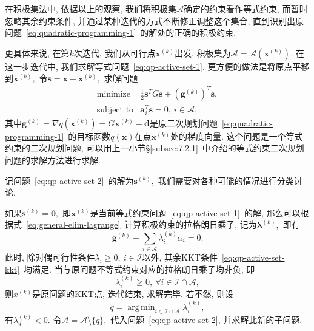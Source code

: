 \documentclass{SBCbookchapter}
\newcommand{\V}[1]{{\bm{#1}}}
\DeclareMathOperator*{\argmin}{arg\,min}
\numberwithin{equation}{section}
\begin{document}
在积极集法中, 依据以上的观察, 我们将积极集$\mathcal{A}$确定的约束看作等式约束, 而暂时忽略其余约束条件, 并通过某种迭代的方式不断修正调整这个集合, 直到识别出原问题~\eqref{eq:quadratic-programming-1}~的解处的正确的积极约束.

更具体来说, 在第$k$次迭代, 我们从可行点$\V{x}^{(k)}$出发, 积极集为$\mathcal{A} = \mathcal{A}(\V{x}^{(k)}).$ 在这一步迭代中, 我们求解等式问题~\eqref{eq:qp-active-set-1}. 更方便的做法是将原点平移到$\V{x}^{(k)},$ 令$\V{s} = \V{x} - \V{x}^{(k)},$ 求解问题
\begin{equation}
\label{eq:qp-active-set-2}
\begin{array}{cl}
\text{minimize} & \frac{1}{2} \V{s}^T G \V{s} + \left( \V{g}^{(k)} \right)^T \V{s}, \\
\text{subject to} & \V{a}_i^T \V{s} = 0, ~ i \in \mathcal{A},
\end{array}
\end{equation}
其中$\V{g}^{(k)} = \nabla q(\V{x}^{(k)}) = G \V{x}^{(k)} + \V{d}$是原二次规划问题~\eqref{eq:quadratic-programming-1}~的目标函数$q(\V{x})$在点$\V{x}^{(k)}$处的梯度向量. 这个问题是一个等式约束的二次规划问题, 可以用上一小节\S\ref{subsec:7.2.1}~中介绍的等式约束二次规划问题的求解方法进行求解.

记问题~\eqref{eq:qp-active-set-2}~的解为$\V{s}^{(k)},$ 我们需要对各种可能的情况进行分类讨论.

如果$\V{s}^{(k)} = \V{0},$ 即$\V{x}^{(k)}$是当前等式约束问题~\eqref{eq:qp-active-set-1}~的解, 那么可以根据式~\eqref{eq:general-elim-lagrange}~计算积极约束的拉格朗日乘子, 记为$\V{\lambda}^{(k)},$ 即有
\begin{equation}
\label{eq:qp-active-set-lambda}
\V{g}^{(k)} + \sum\limits_{i \in \mathcal{A}} \lambda_i^{(k)} \alpha_i = 0.
\end{equation}
此时, 除对偶可行性条件$\lambda_i \geqslant 0, ~ i \in \mathcal{I}$以外, 其余KKT条件~\eqref{eq:qp-active-set-kkt}~均满足. 当与原问题不等式约束对应的拉格朗日乘子均非负, 即
\begin{equation*}
\lambda_i^{(k)} \geqslant 0, ~ \forall i \in \mathcal{I} \cap \mathcal{A},
\end{equation*}
则$x^{(k)}$是原问题的KKT点, 迭代结束, 求解完毕. 若不然, 则设
\begin{equation}
\label{eq:qp-active-set-inactive-index}
q = \argmin_{i \in \mathcal{I} \cap \mathcal{A}} \lambda_i^{(k)},
\end{equation}
有$\lambda_q^{(k)} < 0.$ 令$\mathcal{A} = \mathcal{A} \setminus \{ q \},$ 代入问题~\eqref{eq:qp-active-set-2}, 并求解此新的子问题.
\end{document}

